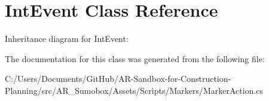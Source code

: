\hypertarget{class_int_event}{}\section{Int\+Event Class Reference}
\label{class_int_event}
Inheritance diagram for Int\+Event\+:\begin{figure}[H]
\begin{center}
\leavevmode
\end{center}
\end{figure}


The documentation for this class was generated from the following file\+:\begin{DoxyCompactItemize}
\item 
C\+:/\+Users/\+Documents/\+Git\+Hub/\+A\+R-\/\+Sandbox-\/for-\/\+Construction-\/\+Planning/src/\+A\+R\+\_\+\+Sumobox/\+Assets/\+Scripts/\+Markers/Marker\+Action.\+cs\end{DoxyCompactItemize}
